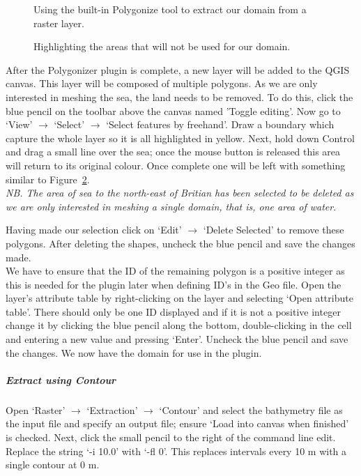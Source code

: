 \begin{figure}[h!]
  \centering
  \caption{Using the built-in Polygonize tool to extract our domain from a raster layer.}
  \label{fig:mn_polygonize}
\end{figure}

\begin{figure}[h!]
  \centering
  \caption{Highlighting the areas that will not be used for our domain.}
  \label{fig:mn_selection}
\end{figure}

After the Polygonizer plugin is complete, a new layer will be added to the QGIS canvas. This layer will be composed of multiple polygons. As we are only interested in meshing the sea, the land needs to be removed. To do this, click the blue pencil on the toolbar above the canvas named 'Toggle editing'. Now go to `View' $\rightarrow$ `Select' $\rightarrow$ `Select features by freehand'. Draw a boundary which capture the whole layer so it is all highlighted in yellow. Next, hold down Control and drag a small line over the sea; once the mouse button is released this area will return to its original colour. Once complete one will be left with something similar to Figure~\ref{fig:mn_selection}. \\
\emph{NB. The area of sea to the north-east of Britian has been selected to be deleted as we are only interested in meshing a single domain, that is, one area of water}.

Having made our selection click on `Edit' $\rightarrow$ `Delete Selected' to remove these polygons. After deleting the shapes, uncheck the blue pencil and save the changes made. \\

We have to ensure that the ID of the remaining polygon is a positive integer as this is needed for the plugin later when defining ID's in the Geo file. Open the layer's attribute table by right-clicking on the layer and selecting `Open attribute table'. There should only be one ID displayed and if it is not a positive integer change it by clicking the blue pencil along the bottom, double-clicking in the cell and entering a new value and pressing `Enter'. Uncheck the blue pencil and save the changes. We now have the domain for use in the plugin.

\subparagraph{Extract using Contour \\}
\label{sec:mn_contour}
Open `Raster' $\rightarrow$ `Extraction' $\rightarrow$ `Contour' and select the bathymetry file as the input file and specify an output file; ensure `Load into canvas when finished' is checked. Next, click the small pencil to the right of the command line edit. Replace the string `-i 10.0' with `-fl 0'. This replaces intervals every 10 m with a single contour at 0 m. \\

